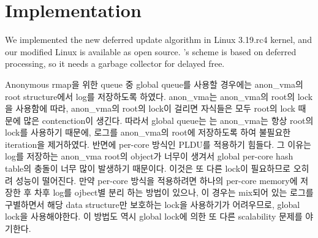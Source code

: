 \section{Implementation}\label{sec:implementation}

We implemented the new deferred update algorithm in Linux 3.19.rc4 kernel, and
our modified Linux is available as open source.
's scheme is based on deferred processing, so it needs a garbage
collector for delayed free.






Anonymous rmap을 위한 queue 중 global queue를 사용할 경우에는 anon\_vma의 root
structure에서 log를 저장하도록 하였다.
anon\_vma는 anon\_vma의 root의 lock을 사용함에 따라, anon\_vma의 root의 lock이 걸리면 자식들은
모두 root의 lock 때문에 많은 contenction이 생긴다.
따라서 global queue는 는 anon\_vma는 항상 root의 lock를 사용하기 때문에, 로그를 anon\_vma의 root에
저장하도록 하여 불필요한 iteration을 제거하였다. 
반면에 per-core 방식인 PLDU를 적용하기 힘들다.
그 이유는 log를 저장하는 anon\_vma root의 object가 너무이 생겨서 global per-core hash
table의 충돌이 너무 많이 발생하기 때문이다. 
이것은 또 다른 lock이 필요하므로 오히려 성능이 떨어진다. 
만약 per-core 방식을 적용하려면 하나의 per-core memory에 저장한 후 차후 log를 ojbect별 분리 하는 방법이 있으나, 
이 경우는  mix되어 있는 로그를 구별하면서 해당 data structure만 보호하는 lock을 사용하기가 어려우므로, global
lock을 사용해야한다.
이 방법도 역시 global lock에 의한 또 다른 scalability 문제를 야기한다.




















